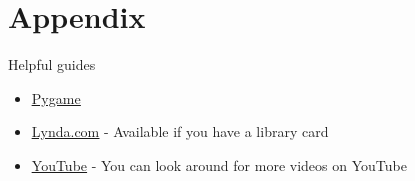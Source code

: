\documentclass[12pt]{article}
\begin{document}
\appendix
\section{Appendix}
Helpful guides
\begin{itemize}
  \item \underline{\href{run:https://www.pygame.org/docs/}{Pygame}}
  \item \underline{\href{run:https://www.lynda.com/Python-tutorials/Python-Essential-Training/614299-2.html?org=reginalibrary}{Lynda.com}} - Available if you have a library card
  \item \underline{\href{https://www.youtube.com/watch?v=_uQrJ0TkZlc}{YouTube}} - You can look around for more videos on YouTube
\end{itemize}
\end{document}
